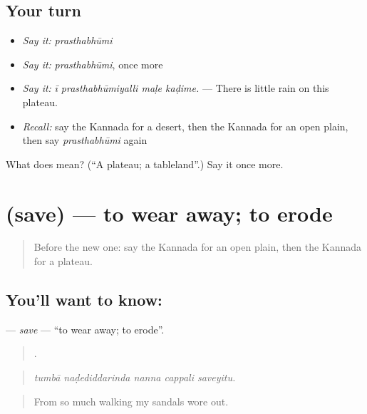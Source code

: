 \subsection*{Your turn}
\begin{itemize}
\raggedright
  \item \emph{Say it:} \emph{prasthabhūmi}
  \item \emph{Say it:} \emph{prasthabhūmi}, once more
  \item \emph{Say it:} \emph{ī prasthabhūmiyalli maḷe kaḍime.} — There is little rain on this plateau.
  \item \emph{Recall:} say the Kannada for a desert, then the Kannada for an open plain, then say \emph{prasthabhūmi} again
\end{itemize}

\begin{tcolorbox}[breakable,colback=teal!4,colframe=teal!35!black,title={Before you move on}]
What does  mean? (\textquotedblleft{}A plateau; a tableland\textquotedblright{}.) Say it once more.
\end{tcolorbox}
\section[\texorpdfstring{\kn{ಸವೆ} (save)}{ಸವೆ (save)}]{ (save) — to wear away; to erode}

\label{lesson:KA-C480-save}



\begin{quote}
Before the new one: say the Kannada for an open plain, then the Kannada for a plateau.
\end{quote}

\subsection*{You'll want to know: }
\textbf{} — \emph{save} — \textquotedblleft{}to wear away; to erode\textquotedblright{}.

\begin{quote}
    .
\end{quote}

\begin{quote}
\emph{tumbā naḍediddarinda nanna cappali saveyitu.}
\end{quote}

\begin{quote}
From so much walking my sandals wore out.
\end{quote}

